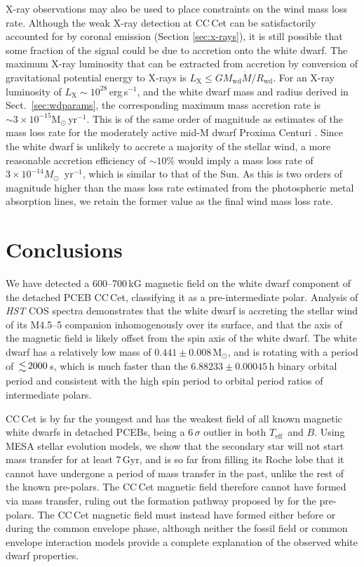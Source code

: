 \documentclass[fleqn,usenatbib]{mnras}
\newcommand{\Msun}{\mbox{$\mathrm{M}_{\odot}$}}
\newcommand{\Teff}{\mbox{$T_{\mathrm{eff}}$}}
\begin{document}
X-ray observations may also be used to place constraints on the wind mass loss rate. Although the weak X-ray detection at CC\,Cet can be satisfactorily accounted for by coronal emission (Section \ref{sec:x-rays}), it is still possible that some fraction of the signal could be due to accretion onto the white dwarf. The maximum X-ray luminosity that can be extracted from accretion by conversion of gravitational potential energy to X-rays is $L_\mathrm{X}\leq GM_\mathrm{wd}\dot{M}/R_\mathrm{wd}$. For an X-ray luminosity of $L_\mathrm{X}\sim 10^{28}$\,erg\,s$^{-1}$, and the white dwarf mass and radius derived in Sect.~\ref{sec:wdparams}, the corresponding maximum mass accretion rate is $\sim 3\times 10^{-15} \Msun$\,yr$^{-1}$. This is of the same order of magnitude as estimates of the mass loss rate for the moderately active mid-M dwarf Proxima Centuri \citep[e.g.][]{wood18-1,Wargelin.Drake:02}. Since the white dwarf is unlikely to accrete a majority of the stellar wind, a more reasonable accretion efficiency of $\sim 10$\% would imply a mass loss rate of $3\times 10^{-14} M_\odot$~yr$^{-1}$, which is similar to that of the Sun. As this is two orders of magnitude higher than the mass loss rate estimated from the photospheric metal absorption lines, we retain the former value as the final wind mass loss rate. 

\section{Conclusions}
\label{sec:conc}
We have detected a 600--700\,kG magnetic field on the white dwarf component of the detached PCEB CC\,Cet, classifying it as a pre-intermediate polar. Analysis of \textit{HST} COS spectra demonstrates that the white dwarf is accreting the stellar wind of its M4.5--5 companion inhomogenously over its surface, and that the axis of the magnetic field is likely offset from the spin axis of the white dwarf. The white dwarf has a relatively low mass of $0.441\pm0.008$\,\Msun, and is rotating with a period of $\la 2000$\,s, which is much faster than the $6.88233\pm0.00045$\,h binary orbital period and consistent with the high spin period to orbital period ratios of intermediate polars.

CC\,Cet is by far the youngest and has the weakest field of all known magnetic white dwarfs in detached PCEBs, being a 6\,$\sigma$ outlier in both \Teff\ and $B$. Using MESA stellar evolution models, we show that the secondary star will not start mass transfer for at least 7\,Gyr, and is so far from filling its Roche lobe that it cannot have undergone a period of mass transfer in the past, unlike the rest of the known pre-polars. The CC\,Cet magnetic field therefore cannot have formed via mass transfer, ruling out the formation pathway proposed by \citet{schreiberetal21-1} for the pre-polars. The CC\,Cet magnetic field must instead have formed either before or during the common envelope phase, although neither the fossil field or common envelope interaction models provide a complete explanation of the observed white dwarf properties. 
\end{document}
